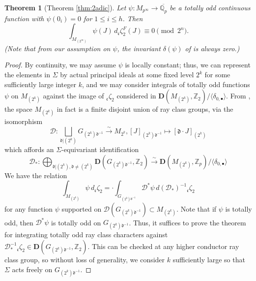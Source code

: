 \documentclass[10pt]{amsart}
\newtheorem{thm}{Theorem}[section]
\theoremstyle{definition}
\newcommand{\Z}{\mathbb{Z}}
\newcommand{\Q}{\mathbb{Q}}
\renewcommand{\c}{\mathfrak{c}}
\renewcommand{\d}{\mathfrak{d}}
\newcommand{\D}{\mathbf{D}}
\numberwithin{equation}{section}
\begin{document}
    \begin{thm}[Theorem \ref{thm:2adic}] \label{thm:2adicbody}
        Let $\psi:M_{p^\infty} \to \overline{\Q_p}$ be a totally odd continuous function with $\psi(0_i)=0$ for $1\le i \le h$. Then 
        \[
        \int_{M_{(2^\infty)}} \psi(J)\, d{}_\c\zeta_2^F(J) \equiv 0 \pmod{2^n}.
        \]
        (Note that from our assumption on $\psi$, the invariant $\delta(\psi)$ of \cite[(8.11)]{DR} is always zero.)
    \end{thm}
    \begin{proof}
        By continuity, we may assume $\psi$ is locally constant; thus,  we can represent the elements in $\Sigma$ by actual principal ideals at some fixed level $2^k$ for some sufficiently large integer $k$, and we may consider integrals of totally odd functions $\psi$ on $M_{(2^k)}$ against the image of ${}_\c\zeta_2$ considered in $\D(M_{(2^k)}, \Z_2)/\langle\delta_{0,\bullet}\rangle$. From \cite[\S2]{DR}, the space $M_{(2^k)}$ in fact is a finite disjoint union of ray class groups, via the isomorphism
        \[
            \mathcal{D}:\bigsqcup_{\mathfrak{d} | (2^k)} G_{(2^k)\mathfrak{d}^{-1}} \xrightarrow{\sim} M_{2^k} , [J]_{(2^k)\mathfrak{d}^{-1}}\mapsto [\mathfrak{d} \cdot J]_{(2^k)}
        \]
        which affords an $\Sigma$-equivariant identification
        \[
            \mathcal{D}_*: \bigoplus_{\mathfrak{d} | (2^k), \mathfrak{d}\ne (2^k)} \mathbf{D}(G_{(2^k)\mathfrak{d}^{-1}}, \Z_2)\xrightarrow{\sim} \D(M_{(2^k)}, \Z_p)/\langle\delta_{0,\bullet}\rangle
        \]
        We have the relation
        \[
            \int_{M_{(2^k)}} \psi\, d{}_\c\zeta_2 =  \cdot \int_{G_{(2^k)\d^{-1}}} \mathcal{D}^*\psi\, d(\mathcal{D}_*)^{-1}{}_\c\zeta_2 
        \]
        for any function $\psi$ supported on $\mathcal{D}(G_{(2^k)\d^{-1}})\subset M_{(2^k)}$. Note that if $\psi$ is totally odd, then $\mathcal{D}^*\psi$ is totally odd on $G_{(2^{k})\d^{-1}}$. Thus, it suffices to prove the theorem for integrating totally odd ray class characters against $\mathcal{D}_*^{-1} {}_\c \zeta_2 \in \D(G_{(2^k)\d^{-1}}, \Z_2)$. This can be checked at any higher conductor ray class group, so without loss of generality, we consider $k$ sufficiently large so that $\Sigma$ acts freely on $G_{(2^k)\d^{-1}}$.


\end{proof}
\end{document}

